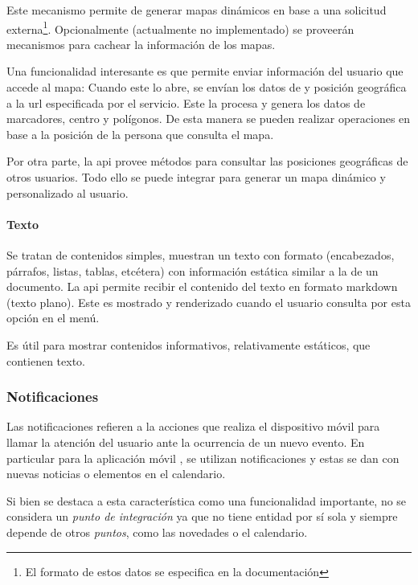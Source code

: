 Este mecanismo permite de generar mapas dinámicos en base a una solicitud externa\footnote{El formato de estos datos se especifica en la documentación}. Opcionalmente (actualmente no implementado) se proveerán mecanismos para cachear la información de los mapas.


Una funcionalidad interesante es que permite enviar información del usuario que accede al mapa: Cuando este lo abre, se envían los datos de  y posición geográfica a la \gls{url} especificada por el servicio. Este la procesa y genera los datos de marcadores, centro y polígonos. De esta manera se pueden realizar operaciones en base a la posición de la persona que consulta el mapa.

Por otra parte, la \gls{api} provee métodos para consultar las posiciones geográficas de otros usuarios. Todo ello se puede integrar para generar un mapa dinámico y personalizado al usuario.

\paragraph{Texto}
\label{funcionalidad_contenidos_texto} 

Se tratan de contenidos simples, muestran un texto con formato (encabezados, párrafos, listas, tablas, etcétera) con información estática similar a la de un documento. 
La \gls{api} permite recibir el contenido del texto en formato \gls{markdown} (texto plano). Este es mostrado y renderizado cuando el usuario consulta por esta opción en el menú.

Es útil para mostrar contenidos informativos, relativamente estáticos, que contienen texto.

\subsubsection{Notificaciones}
\label{funcionalidad_notificaciones}

Las notificaciones refieren a la acciones que realiza el dispositivo móvil para llamar la atención del usuario ante la ocurrencia de un nuevo evento. En particular para la aplicación móvil \nombreApp{}, se utilizan notificaciones  y estas se dan con nuevas noticias o elementos en el calendario.

Si bien se destaca a esta característica como una funcionalidad importante, no se considera un \textit{punto de integración} ya que no tiene entidad por sí sola y siempre depende de otros \textit{puntos}, como las novedades o el calendario.


